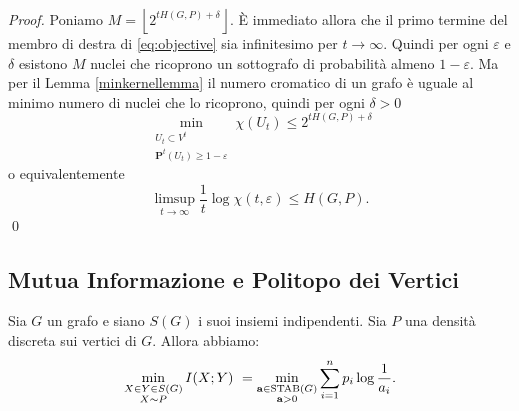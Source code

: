 \begin{proof}
	Poniamo \(M=\left\lfloor 2^{tH(G,P)+\delta}\right\rfloor\). È immediato allora che il primo termine del membro di destra di \eqref{eq:objective} sia infinitesimo per \(t\to \infty\). Quindi per ogni \(\varepsilon\) e \(\delta\) esistono \(M\) nuclei che ricoprono un sottografo di probabilità almeno \(1-\varepsilon\). Ma per il Lemma \ref{minkernellemma} il numero cromatico di un grafo è uguale al minimo numero di nuclei che lo ricoprono, quindi per ogni \(\delta>0\)
	\[\min_{\substack{U_{t}\subset V^{t}\\
	\mathbf{P}^t(U_{t})\ge 1-\varepsilon}} \chi(U_{t})\le 2^{tH(G,P)+\delta}\]
	o equivalentemente
	\[\limsup_{t\to \infty}\frac{1}{t} \log{\chi({t,\varepsilon})}\le H(G,P).\]
	\qed 
\end{proof}

\subsection{Mutua Informazione e Politopo dei Vertici} 
\begin{theorem}
	 Sia \(G\) un grafo e siano \(S(G)\) i suoi insiemi indipendenti. Sia \(P\) una densità discreta sui vertici di \(G\). Allora abbiamo:
	\[\min_{\substack{X\in Y\in S(G) \\
	X\sim P}} I(X;Y)\ = \min_{\substack{\mathbf{a}\in \text{\text{STAB}}(G) \\
	\mathbf{a}>0}} \sum_{i=1}^n p_i\log{\frac{1}{a_i}}\text{.}\]
\end{theorem}
